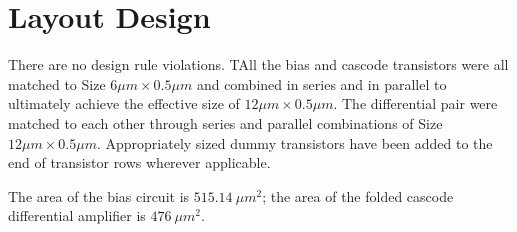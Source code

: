 \documentclass[11pt]{article}
\begin{document}
\FloatBarrier
\section{Layout Design}
    There are no design rule violations. TAll the bias and cascode transistors were all matched to Size $6\mu m \times 0.5\mu m$ and combined in series and in parallel to ultimately achieve the effective size of $12\mu m \times 0.5\mu m$. The differential pair were matched to each other through series and parallel combinations of Size $12\mu m \times 0.5\mu m$. Appropriately sized dummy transistors have been added to the end of transistor rows wherever applicable.

    The area of the bias circuit is $515.14\ \mu m^2$; the area of the folded cascode differential amplifier is $476\ \mu m^2$.
\end{document}
